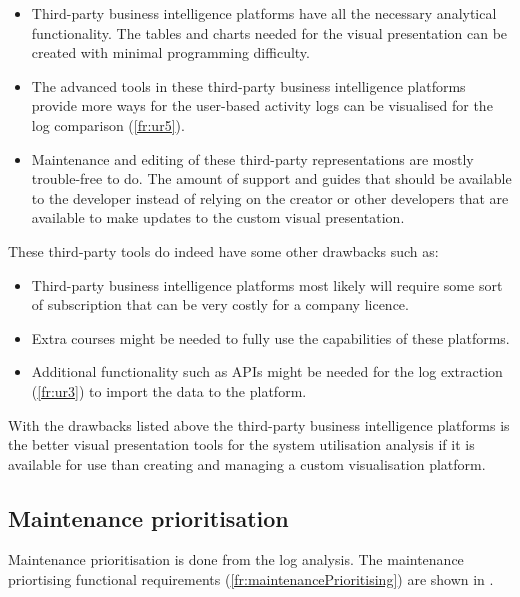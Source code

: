\begin{itemize}
	\item \RaggedRight Third-party business intelligence platforms have all the necessary analytical functionality. The tables and charts needed for the visual presentation can be created with minimal programming difficulty.
	\item \RaggedRight The advanced tools in these third-party business intelligence platforms provide more ways for the user-based activity logs can be visualised for the log comparison (\ref{fr:ur5}).
	\item \RaggedRight Maintenance and editing of these third-party representations are mostly trouble-free to do. The amount of support and guides that should be available to the developer instead of relying on the creator or other developers that are available to make updates to the custom visual presentation.
\end{itemize}

These third-party tools do indeed have some other drawbacks such as:

\begin{itemize}
	\item \RaggedRight Third-party business intelligence platforms most likely will require some sort of subscription that can be very costly for a company licence.
	\item \RaggedRight Extra courses might be needed to fully use the capabilities of these platforms.
	\item \RaggedRight Additional functionality such as APIs might be needed for the log extraction (\ref{fr:ur3}) to import the data to the platform.
\end{itemize}

With the drawbacks listed above the third-party business intelligence platforms is the better visual presentation tools for the system utilisation analysis if it is available for use than creating and managing a custom visualisation platform.

\subsection{Maintenance prioritisation}\label{sec:ch2_utilisationImprovements}
Maintenance prioritisation is done from the log analysis. The maintenance priortising functional requirements (\ref{fr:maintenancePrioritising}) are shown in .

